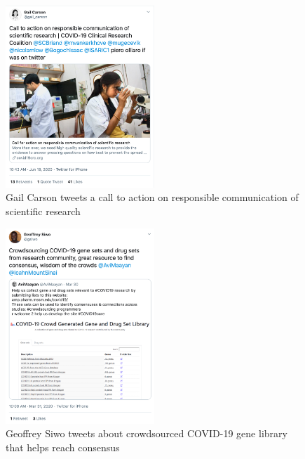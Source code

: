 \documentclass[acmsmall,authordraft]{acmart}
\begin{document}
\begin{figure}
  \includegraphics[width=0.5\textwidth]{Pictures/Appendix_Tweets/gail carson tweet.png}
  \caption{Gail Carson tweets a call to action on responsible communication of scientific research}
  \label{gail_carson_tweet}
\end{figure}

\begin{figure}
  \includegraphics[width=0.5\textwidth]{Pictures/Appendix_Tweets/geoffrey siwo tweet.png}
  \caption{Geoffrey Siwo tweets about crowdsourced COVID-19 gene library that helps reach consensus}
  \label{geoffrey_siwo_tweet}
\end{figure}
\end{document}
